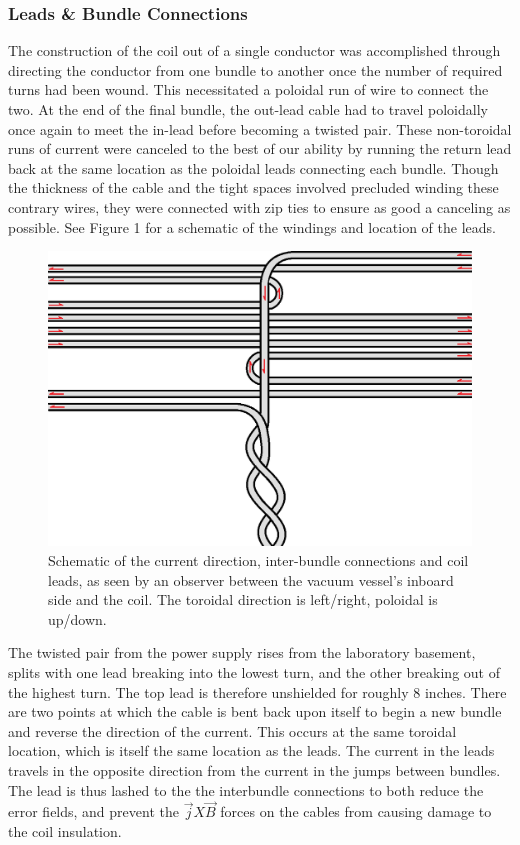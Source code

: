 \subsubsection{Leads \& Bundle Connections} 
The construction of the coil out of a single conductor was accomplished through directing the conductor from one bundle to another once the number of required turns had been wound.  This necessitated a poloidal run of wire to connect the two.  At the end of the final bundle, the out-lead cable had to travel poloidally once again to meet the in-lead before becoming a twisted pair.  These non-toroidal runs of current were canceled to the best of our ability by running the return lead back at the same location as the poloidal leads connecting each bundle.  Though the thickness of the cable and the tight spaces involved precluded winding these contrary wires, they were connected with zip ties to ensure as good a canceling as possible.  See Figure 1 for a schematic of the windings and location of the leads.\\
\begin{figure}
\includegraphics[width = \textwidth]{./figures/Coil_winding_schematic.png}\begin{flushleft}
\caption{Schematic of the current direction, inter-bundle connections and coil leads, as seen by an observer between the vacuum vessel's inboard side and the coil.  The toroidal direction is left/right, poloidal is up/down.}
\end{flushleft}
\label{coil_winding}
\end{figure}
The twisted pair from the power supply rises from the laboratory basement, splits with one lead breaking into the lowest turn, and the other breaking out of the highest turn.  The top lead is therefore unshielded for roughly 8 inches.  There are two points at which the cable is bent back upon itself to begin a new bundle and reverse the direction of the current.  This occurs at the same toroidal location, which is itself the same location as the leads.  The current in the leads travels in the opposite direction from the current in the jumps between bundles.  The lead is thus lashed to the the interbundle connections to both reduce the error fields, and prevent the $\vec{j} X \vec{B}$ forces on the cables from causing damage to the coil insulation.
